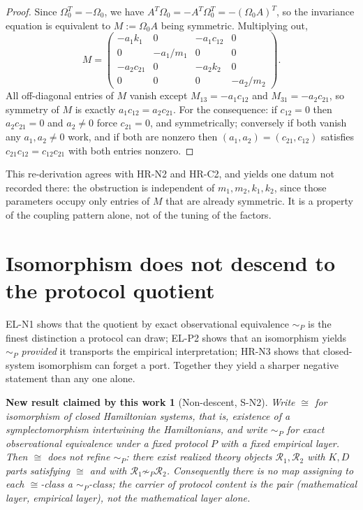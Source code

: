 \documentclass[11pt]{article}
\theoremstyle{plain}
\newtheorem{newresult}[definition]{New result claimed by this work}
\begin{document}
\begin{proof}
Since $\Omega_0^{T}=-\Omega_0$, we have
$A^{T}\Omega_0=-A^{T}\Omega_0^{T}=-(\Omega_0A)^{T}$, so the invariance equation
is equivalent to $M:=\Omega_0A$ being symmetric. Multiplying out,
\[
 M=\begin{pmatrix}
 -a_1k_1 & 0 & -a_1c_{12} & 0\\
 0 & -a_1/m_1 & 0 & 0\\
 -a_2c_{21} & 0 & -a_2k_2 & 0\\
 0 & 0 & 0 & -a_2/m_2
 \end{pmatrix}.
\]
All off-diagonal entries of $M$ vanish except $M_{13}=-a_1c_{12}$ and
$M_{31}=-a_2c_{21}$, so symmetry of $M$ is exactly $a_1c_{12}=a_2c_{21}$.
For the consequence: if $c_{12}=0$ then $a_2c_{21}=0$ and $a_2\neq0$ force
$c_{21}=0$, and symmetrically; conversely if both vanish any $a_1,a_2\neq0$
work, and if both are nonzero then $(a_1,a_2)=(c_{21},c_{12})$ satisfies
$c_{21}c_{12}=c_{12}c_{21}$ with both entries nonzero.
\end{proof}

This re-derivation agrees with HR-N2 and HR-C2, and yields one datum not
recorded there: the obstruction is independent of $m_1,m_2,k_1,k_2$, since those
parameters occupy only entries of $M$ that are already symmetric. It is a
property of the coupling pattern alone, not of the tuning of the factors.

\section{Isomorphism does not descend to the protocol quotient}
\label{sec:descent}

EL-N1 shows that the quotient by exact observational equivalence $\sim_P$ is the
finest distinction a protocol can draw; EL-P2 shows that an isomorphism yields
$\sim_P$ \emph{provided} it transports the empirical interpretation; HR-N3 shows
that closed-system isomorphism can forget a port. Together they yield a sharper
negative statement than any one alone.

\begin{newresult}[Non-descent, S-N2]
\label{res:nondescent}
Write $\cong$ for isomorphism of closed Hamiltonian systems, that is, existence
of a symplectomorphism intertwining the Hamiltonians, and write $\sim_P$ for
exact observational equivalence under a fixed protocol $P$ with a fixed
empirical layer. Then $\cong$ does not refine $\sim_P$: there exist realized
theory objects $\mathcal{R}_1,\mathcal{R}_2$ with $K,D$ parts satisfying
$\cong$ and with $\mathcal{R}_1\not\sim_P\mathcal{R}_2$. Consequently there is no
map assigning to each $\cong$-class a $\sim_P$-class; the carrier of protocol
content is the pair (mathematical layer, empirical layer), not the mathematical
layer alone.
\end{newresult}
\end{document}
